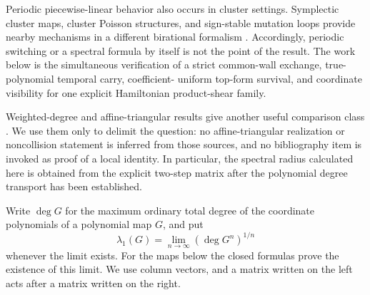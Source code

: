 \documentclass[11pt]{article}
\theoremstyle{definition}
\theoremstyle{remark}
\begin{document}
Periodic piecewise-linear behavior also occurs in cluster settings.
Symplectic cluster maps, cluster Poisson structures, and sign-stable mutation
loops provide nearby mechanisms in a different birational formalism
\citep{FordyHoneSymplecticCluster,FordyHoneClusterPoisson,IshibashiKanoSignStableEntropy}.
Accordingly, periodic switching or a spectral formula by itself is not the
point of the result.  The work below is the simultaneous verification of a
strict common-wall exchange, true-polynomial temporal carry, coefficient-
uniform top-form survival, and coordinate visibility for one explicit
Hamiltonian product-shear family.

Weighted-degree and affine-triangular results give another useful comparison
class \citep{BlancVanSantenAffineTriangular,ShaoSunDimensionFour}.  We use
them only to delimit the question: no affine-triangular realization or
noncollision statement is inferred from those sources, and no bibliography
item is invoked as proof of a local identity.  In particular, the spectral
radius calculated here is obtained from the explicit two-step matrix after
the polynomial degree transport has been established.

Write \(\deg G\) for the maximum ordinary total degree of the coordinate
polynomials of a polynomial map \(G\), and put
\[
\lambda_1(G)=\lim_{n\to\infty}(\deg G^n)^{1/n}
\]
whenever the limit exists.  For the maps below the closed formulas prove the
existence of this limit.  We use column vectors, and a matrix written on the
left acts after a matrix written on the right.
\end{document}
